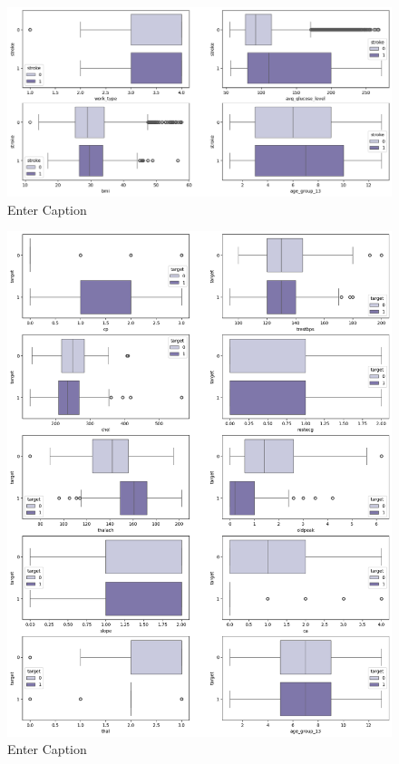 \documentclass[onecolumn,12pt]{article}
\begin{document}
\begin{figure}
    \centering
    \includegraphics[width=1\linewidth]{raport/graphs/stroke_boxplots.png}
    \caption{Enter Caption}
    \label{fig:enter-label}
\end{figure}

\begin{figure}
    \centering
    \includegraphics[width=1\linewidth]{raport/graphs/hypertension_boxplot.png}
    \caption{Enter Caption}
    \label{fig:enter-label}
\end{figure}
\end{document}
